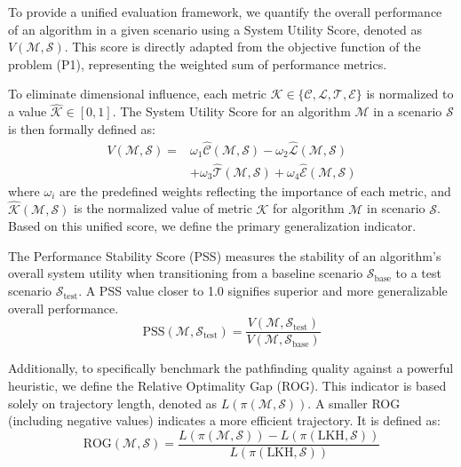 \documentclass[10pt,conference,letterpaper]{IEEEtran}
\begin{document}
To provide a unified evaluation framework, we quantify the overall performance of an algorithm in a given scenario using a System Utility Score, denoted as $V(\mathcal{M}, \mathcal{S})$. This score is directly adapted from the objective function of the problem (P1), representing the weighted sum of performance metrics.

To eliminate dimensional influence, each metric $\mathcal{K} \in \{\mathcal{C}, \mathcal{L}, \mathcal{T}, \mathcal{E}\}$ is normalized to a value $\hat{\mathcal{K}} \in [0, 1]$. The System Utility Score for an algorithm $\mathcal{M}$ in a scenario $\mathcal{S}$ is then formally defined as:
\begin{equation}
\begin{split}
V(\mathcal{M}, \mathcal{S}) = &\omega_1 \hat{\mathcal{C}}(\mathcal{M}, \mathcal{S}) - \omega_2 \hat{\mathcal{L}}(\mathcal{M}, \mathcal{S}) \\
&+ \omega_3 \hat{\mathcal{T}}(\mathcal{M}, \mathcal{S}) + \omega_4 \hat{\mathcal{E}}(\mathcal{M}, \mathcal{S})
\end{split}
\end{equation}
where $\omega_i$ are the predefined weights reflecting the importance of each metric, and $\hat{\mathcal{K}}(\mathcal{M}, \mathcal{S})$ is the normalized value of metric $\mathcal{K}$ for algorithm $\mathcal{M}$ in scenario $\mathcal{S}$. Based on this unified score, we define the primary generalization indicator.

The Performance Stability Score (PSS) measures the stability of an algorithm's overall system utility when transitioning from a baseline scenario $\mathcal{S}_{\text{base}}$ to a test scenario $\mathcal{S}_{\text{test}}$. A PSS value closer to 1.0 signifies superior and more generalizable overall performance.
\begin{equation}
\text{PSS}(\mathcal{M}, \mathcal{S}_{\text{test}}) = \frac{V(\mathcal{M}, \mathcal{S}_{\text{test}})}{V(\mathcal{M}, \mathcal{S}_{\text{base}})}
\end{equation}

Additionally, to specifically benchmark the pathfinding quality against a powerful heuristic, we define the Relative Optimality Gap (ROG). This indicator is based solely on trajectory length, denoted as $L(\pi(\mathcal{M},\mathcal{S}))$. A smaller ROG (including negative values) indicates a more efficient trajectory. It is defined as:
\begin{equation}
\text{ROG}(\mathcal{M}, \mathcal{S}) = \frac{L(\pi(\mathcal{M},\mathcal{S})) - L(\pi(\text{LKH},\mathcal{S}))}{L(\pi(\text{LKH},\mathcal{S}))}
\end{equation}
\end{document}
